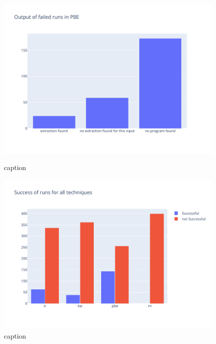 \documentclass[\myrootdir/main.tex]{subfiles}
\begin{document}
\begin{figure}[hp]
	\centering
	\begin{minipage}{0.45\textwidth}
		\centering
		\includegraphics[width=\textwidth, clip]{img/big-study/ouput-failed-pbe.pdf}
		\caption{caption}
		\label{fig:ouput-failed-pbe}
	\end{minipage}\hfill
	\begin{minipage}{0.45\textwidth}
		\centering
		\includegraphics[width=\textwidth, clip]{img/big-study/success-all.pdf}
		\caption{caption}
		\label{fig:success-all}
	\end{minipage}
\end{figure}
\end{document}
